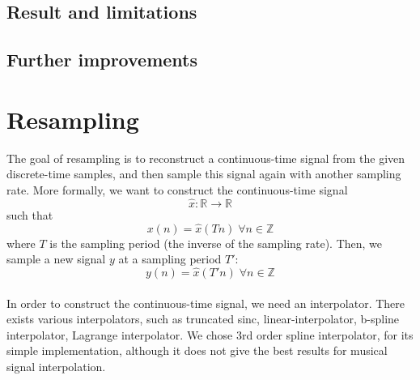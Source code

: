 \documentclass[letterpaper]{article}
\begin{document}
\subsection{Result and limitations}
\subsection{Further improvements}

\section{Resampling}
The goal of resampling is to reconstruct a continuous-time signal from the given
discrete-time samples, and then sample this signal again with another sampling
rate. More formally, we want to construct the continuous-time signal
\begin{equation}\hat x:\mathbb{R}\to\mathbb{R}\end{equation}
such that
\begin{equation}x(n) = \hat x(Tn) \;\forall n\in\mathbb{Z}\end{equation}
where \(T\) is the sampling period (the inverse of the sampling rate). Then, we
sample a new signal \(y\) at a sampling period \(T'\):
\begin{equation*}y(n) = \hat x(T'n) \;\forall n\in\mathbb{Z}\end{equation*}
\paragraph{}
In order to construct the continuous-time signal, we need an interpolator. There
exists various interpolators, such as truncated sinc, linear-interpolator,
b-spline interpolator, Lagrange interpolator. We chose 3rd order spline
interpolator, for its simple implementation, although it does not give the best
results for musical signal interpolation.
\end{document}
